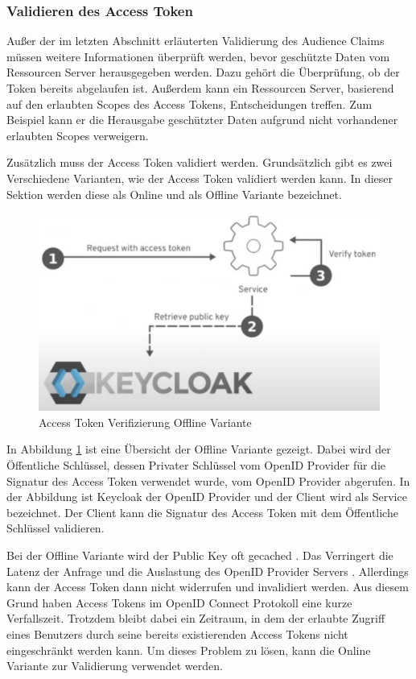 \subsubsection{Validieren des Access Token} \label{Validieren des Access Token}

Außer der im letzten Abschnitt erläuterten Validierung des Audience Claims müssen weitere Informationen überprüft werden, bevor geschützte Daten vom Ressourcen Server herausgegeben werden. Dazu gehört die Überprüfung, ob der Token bereits abgelaufen ist. Außerdem kann ein Ressourcen Server, basierend auf den erlaubten Scopes des Access Tokens, Entscheidungen treffen. Zum Beispiel kann er die Herausgabe geschützter Daten aufgrund nicht vorhandener erlaubten Scopes verweigern.

Zusätzlich muss der Access Token validiert werden. Grundsätzlich gibt es zwei Verschiedene Varianten, wie der Access Token validiert werden kann. In dieser Sektion werden diese als Online und als Offline Variante bezeichnet.

\begin{figure}[!ht]
	\centering
	\includegraphics[width=.8\textwidth]{Images/Ebert/VerifyAccessTokenOffline.PNG}
	\caption{Access Token Verifizierung Offline Variante \cite{EB32}}
	\label{fig:EB_Access Token Verifizierung Offline Variante}
\end{figure}

In Abbildung \ref{fig:EB_Access Token Verifizierung Offline Variante} ist eine Übersicht der Offline Variante gezeigt. Dabei wird der Öffentliche Schlüssel, dessen Privater Schlüssel vom OpenID Provider für die Signatur des Access Token verwendet wurde, vom OpenID Provider abgerufen. In der Abbildung ist Keycloak der OpenID Provider und der Client wird als Service bezeichnet. Der Client kann die Signatur des Access Token mit dem Öffentliche Schlüssel validieren.

Bei der Offline Variante wird der Public Key oft gecached \cite{EB32}. Das Verringert die Latenz der Anfrage und die Auslastung des OpenID Provider Servers \cite{EB32}. Allerdings kann der Access Token dann nicht widerrufen und invalidiert werden. Aus diesem Grund haben Access Tokens im OpenID Connect Protokoll eine kurze Verfallszeit. Trotzdem bleibt dabei ein Zeitraum, in dem der erlaubte Zugriff eines Benutzers durch seine bereits existierenden Access Tokens nicht eingeschränkt werden kann. Um dieses Problem zu lösen, kann die Online Variante zur Validierung verwendet werden. %

